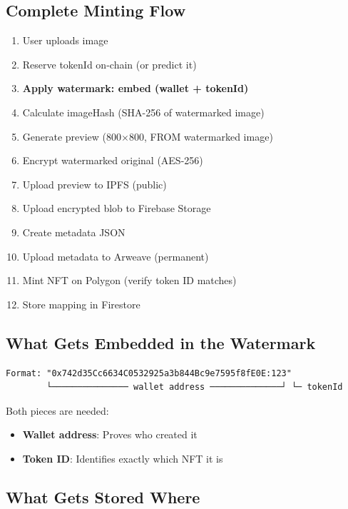 \documentclass[11pt,a4paper]{article}
\begin{document}
\subsection{Complete Minting Flow}

\begin{enumerate}
    \item User uploads image
    \item Reserve tokenId on-chain (or predict it)
    \item \textbf{Apply watermark: embed (wallet + tokenId)}
    \item Calculate imageHash (SHA-256 of watermarked image)
    \item Generate preview (800$\times$800, FROM watermarked image)
    \item Encrypt watermarked original (AES-256)
    \item Upload preview to IPFS (public)
    \item Upload encrypted blob to Firebase Storage
    \item Create metadata JSON
    \item Upload metadata to Arweave (permanent)
    \item Mint NFT on Polygon (verify token ID matches)
    \item Store mapping in Firestore
\end{enumerate}

\subsection{What Gets Embedded in the Watermark}

\begin{mdframed}[style=codeblock]
\begin{verbatim}
Format: "0x742d35Cc6634C0532925a3b844Bc9e7595f8fE0E:123"
        └─────────────── wallet address ──────────────┘ └─ tokenId
\end{verbatim}
\end{mdframed}

Both pieces are needed:
\begin{itemize}
    \item \textbf{Wallet address}: Proves who created it
    \item \textbf{Token ID}: Identifies exactly which NFT it is
\end{itemize}

\subsection{What Gets Stored Where}
\end{document}
